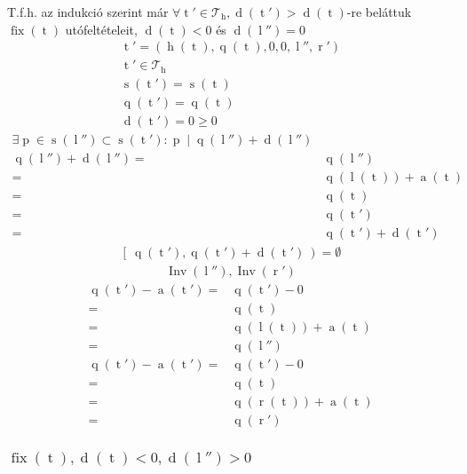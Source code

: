 \documentclass{article}
\newcommand*{\Trees}{\ensuremath{\mathcal{T}}}
\newcommand*{\fFix}{\ensuremath{\operatorname{fix}}}
\newcommand*{\fInv}{\ensuremath{\operatorname{Inv}}}
\newcommand*{\sAccumulated}[1]{\ensuremath{\operatorname{a}\left(#1\right)}}
\newcommand*{\sDiff}[1]{\ensuremath{\operatorname{d}\left(#1\right)}}
\newcommand*{\sHeight}[1]{\ensuremath{\operatorname{h}\left(#1\right)}}
\newcommand*{\sLeft}[1]{\ensuremath{\operatorname{l}\left(#1\right)}}
\newcommand*{\sPosition}[1]{\ensuremath{\operatorname{q}\left(#1\right)}}
\newcommand*{\sPrimes}[1]{\ensuremath{\operatorname{s}\left(#1\right)}}
\newcommand*{\sRight}[1]{\ensuremath{\operatorname{r}\left(#1\right)}}
\newcommand*{\vH}{\ensuremath{\operatorname{h}}}
\newcommand*{\vL}{\ensuremath{\operatorname{l}}}
\newcommand*{\vP}{\ensuremath{\operatorname{p}}}
\newcommand*{\vR}{\ensuremath{\operatorname{r}}}
\newcommand*{\vT}{\ensuremath{\operatorname{t}}}
\begin{document}
T.f.h. az indukció szerint már
$\forall \vT' \in \Trees_{\vH}, \sDiff{\vT'}>\sDiff{\vT}$-re
beláttuk $\fFix(\vT)$ utófeltételeit,
$ \sDiff{\vT} < 0 $ és $ \sDiff{\vL''} = 0 $
\begin{align*}
\vT' = (\sHeight{\vT}, \sPosition{\vT}, 0, 0, \vL'', \vR') \\
\vT' \in \Trees_{\vH} \tag{F1} \\
\sPrimes{\vT'} = \sPrimes{\vT} \tag{F2} \\
\sPosition{\vT'} = \sPosition{\vT} \tag{F3} \\
\sDiff{\vT'} = 0 \ge 0 \tag{F4}
\end{align*}
\begin{align*}
\exists \vP \in \sPrimes{\vL''} \subset \sPrimes{\vT'}:
	\vP \mid \sPosition{\vL''} + \sDiff{\vL''} \\
\sPosition{\vL''} + \sDiff{\vL''} =& \sPosition{\vL''} \\
	=& \sPosition{\sLeft{\vT}} + \sAccumulated{\vT} \\
	=& \sPosition{\vT} \\
	=& \sPosition{\vT'} \\
	=& \sPosition{\vT'} + \sDiff{\vT'} \tag{I1}
\end{align*}
\begin{align*}
\left[\ \sPosition{\vT'} , \sPosition{\vT'} + \sDiff{\vT'}\ \right)
	= \emptyset \tag{I2}
\end{align*}
\begin{align*}
\fInv(\vL''), \fInv(\vR') \tag{I3}
\end{align*}
\begin{align*}
\sPosition{\vT'} - \sAccumulated{\vT'}
	=& \sPosition{\vT'} - 0 \\
	=& \sPosition{\vT} \\
	=& \sPosition{\sLeft{\vT}} + \sAccumulated{\vT} \\
	=& \sPosition{\vL''} \\
\sPosition{\vT'} - \sAccumulated{\vT'}
	=& \sPosition{\vT'} - 0 \\
	=& \sPosition{\vT} \\
	=& \sPosition{\sRight{\vT}} + \sAccumulated{\vT} \\
	=& \sPosition{\vR'} \tag{I4, F5}
\end{align*}

\subsubsection{$ \fFix(\vT), \sDiff{\vT} < 0, \sDiff{\vL''} > 0 $}
\end{document}
